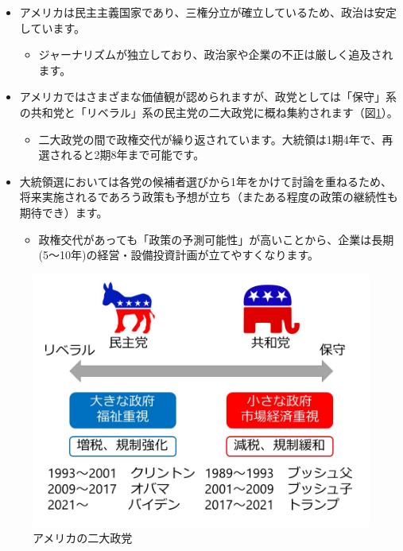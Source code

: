 \documentclass[
]{book}
\providecommand{\tightlist}{%
  \setlength{\itemsep}{0pt}\setlength{\parskip}{0pt}}
\begin{document}
\begin{itemize}
\item
  アメリカは民主主義国家であり、三権分立が確立しているため、政治は安定しています。

  \begin{itemize}
  \tightlist
  \item
    ジャーナリズムが独立しており、政治家や企業の不正は厳しく追及されます。
  \end{itemize}
\item
  アメリカではさまざまな価値観が認められますが、政党としては「保守」系の共和党と「リベラル」系の民主党の二大政党に概ね集約されます（図\ref{fig:USPARTY}）。

  \begin{itemize}
  \tightlist
  \item
    二大政党の間で政権交代が繰り返されています。大統領は1期4年で、再選されると2期8年まで可能です。
  \end{itemize}
\item
  大統領選においては各党の候補者選びから1年をかけて討論を重ねるため、将来実施されるであろう政策も予想が立ち（またある程度の政策の継続性も期待でき）ます。

  \begin{itemize}
  \tightlist
  \item
    政権交代があっても「政策の予測可能性」が高いことから、企業は長期(5〜10年)の経営・設備投資計画が立てやすくなります。
  \end{itemize}
\end{itemize}

\begin{figure}
\includegraphics[width=960px]{usparty} \caption{アメリカの二大政党}\label{fig:USPARTY}
\end{figure}
\end{document}
